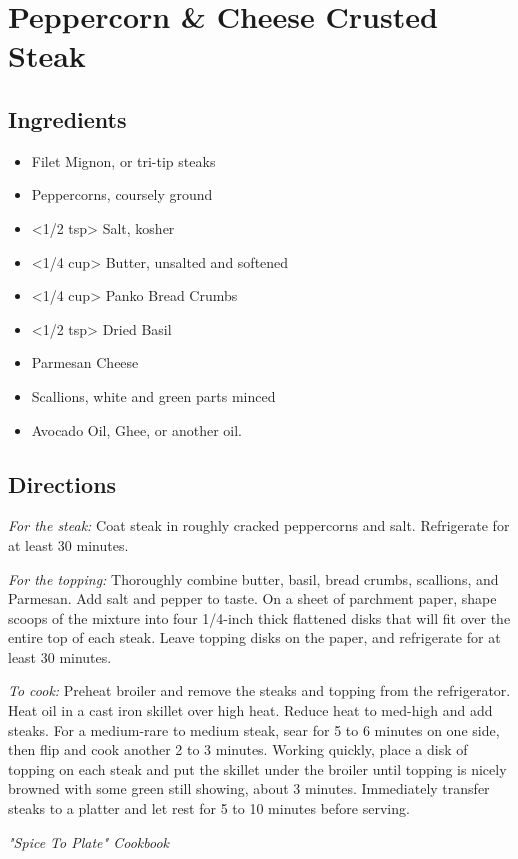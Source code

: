 \section{Peppercorn \& Cheese Crusted Steak}

\subsection{ Ingredients }

\begin{itemize}
  \item <20 oz> Filet Mignon, or tri-tip steaks
  \item <2 tbs> Peppercorns, coursely ground
  \item <1/2 tsp> Salt, kosher
  \item <1/4 cup> Butter, unsalted and softened
  \item <1/4 cup> Panko Bread Crumbs
  \item <1/2 tsp> Dried Basil
  \item <2 tbs> Parmesan Cheese
  \item <2> Scallions, white and green parts minced
  \item <1 tbs> Avocado Oil, Ghee, or another oil. 
\end{itemize}

\subsection{ Directions }

\textit{For the steak:} Coat steak in roughly cracked peppercorns and salt. Refrigerate for at least 30 minutes. 

\textit{For the topping:} Thoroughly combine butter, basil, bread crumbs, scallions, and Parmesan. Add salt and pepper to taste. On a sheet of parchment paper, shape scoops of the mixture into four 1/4-inch thick flattened disks that will fit over the entire top of each steak. Leave topping disks on the paper, and refrigerate for at least 30 minutes. 

\textit{To cook:} Preheat broiler and remove the steaks and topping from the refrigerator. Heat oil in a cast iron skillet over high heat. Reduce heat to med-high and add steaks. For a medium-rare to medium steak, sear for 5 to 6 minutes on one side, then flip and cook another 2 to 3 minutes. Working quickly, place a disk of topping on each steak and put the skillet under the broiler until topping is nicely browned with some green still showing, about 3 minutes. Immediately transfer steaks to a platter and let rest for 5 to 10 minutes before serving. 

\textit{"Spice To Plate" Cookbook}
